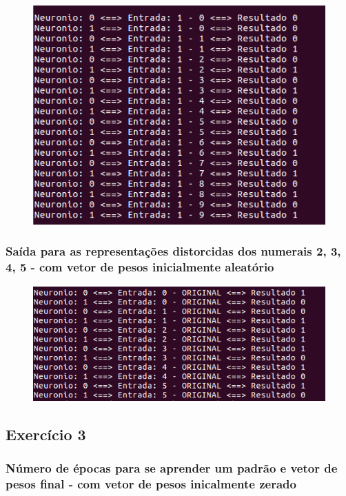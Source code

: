 \documentclass[hidelinks,12pt]{article}
\begin{document}
		\begin{figure}[!h]
			\centering
			\includegraphics[scale=0.7]{Figures/E2S1R.png}
		\end{figure}
		
		\newpage
		
		\subsubsection{Saída para as representações distorcidas dos numerais 2, 3, 4, 5 - com vetor de pesos inicialmente aleatório}
		
		\begin{figure}[!h]
			\centering
			\includegraphics[scale=0.7]{Figures/E2SALLR.png}
		\end{figure}
		
	\subsection{Exercício 3}
		
		\subsubsection{Número de épocas para se aprender um padrão e vetor de pesos final - com vetor de pesos inicalmente zerado}
		
\end{document}
